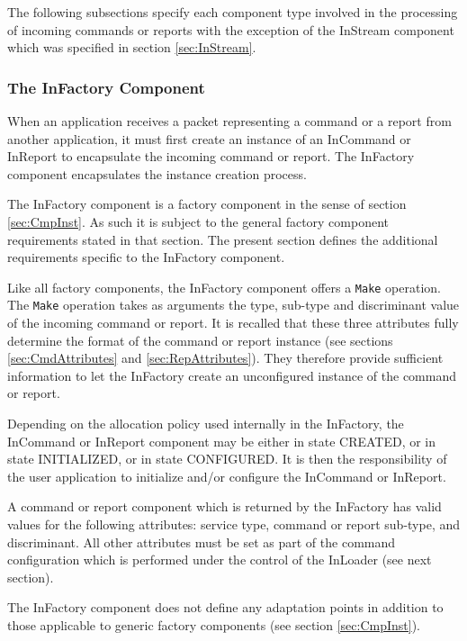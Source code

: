 \documentclass[a4paper,10pt]{article}
\begin{document}
The following subsections specify each component type involved in the processing of incoming commands or reports with the exception of the InStream component which was specified in section \ref{sec:InStream}. 

\subsubsection{The InFactory Component}\label{sec:InFactory}

When an application receives a packet representing a command or a report from another application, it must first create an instance of an InCommand or InReport to encapsulate the incoming command or report. The InFactory component encapsulates the instance creation process.

The InFactory component is a factory component in the sense of section \ref{sec:CmpInst}. As such it is subject to the general factory component requirements stated in that section. The present section defines the additional requirements specific to the InFactory component.

Like all factory components, the InFactory component offers a \texttt{Make} operation. The \texttt{Make} operation takes as arguments the type, sub-type and discriminant value of the incoming command or report. It is recalled that these three attributes fully determine the format of the command or report instance (see sections \ref{sec:CmdAttributes} and \ref{sec:RepAttributes}). They therefore provide sufficient information to let the InFactory create an unconfigured instance of the command or report.

Depending on the allocation policy used internally in the InFactory, the InCommand or InReport component may be either in state CREATED, or in state INITIALIZED, or in state CONFIGURED. It is then the responsibility of the user application to initialize and/or configure the InCommand or InReport.

A command or report component which is returned by the InFactory has valid values for the following attributes: service type, command or report sub-type, and discriminant. All other attributes must be set as part of the command configuration which is performed under the control of the InLoader (see next section).

The InFactory component does not define any adaptation points in addition to those applicable to generic factory components (see section \ref{sec:CmpInst}). 
\end{document}
